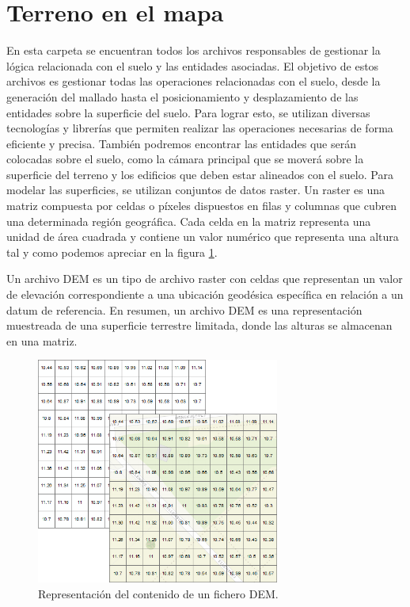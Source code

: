 \documentclass[a4paper, 11pt]{book}
\begin{document}
\section{Terreno en el mapa}
\label{sec:mapGround}
En esta carpeta se encuentran todos los archivos responsables de gestionar la lógica relacionada con el suelo y las entidades asociadas. El objetivo de estos archivos es gestionar todas las operaciones relacionadas con el suelo, desde la generación del mallado hasta el posicionamiento y desplazamiento de las entidades sobre la superficie del suelo. Para lograr esto, se utilizan diversas tecnologías y librerías que permiten realizar las operaciones necesarias de forma eficiente y precisa.
También podremos encontrar las entidades que serán colocadas sobre el suelo, como la cámara principal que se moverá sobre la superficie del terreno y los edificios que deben estar alineados con el suelo. Para modelar las superficies, se utilizan conjuntos de datos raster. Un raster es una matriz compuesta por celdas o píxeles dispuestos en filas y columnas que cubren una determinada región geográfica.
Cada celda en la matriz representa una unidad de área cuadrada y contiene un valor numérico que representa una altura tal y como podemos apreciar en la figura \ref{fig:dem}.

Un archivo DEM es un tipo de archivo raster con celdas que representan un valor de elevación correspondiente a una ubicación geodésica específica en relación a un datum de referencia. En resumen, un archivo DEM es una representación muestreada de una superficie terrestre limitada, donde las alturas se almacenan en una matriz.

\begin{figure}[h]
  \centering
  \includegraphics[width=8cm, keepaspectratio]{img/dem.png}
  \caption{Representación del contenido de un fichero DEM.}
  \label{fig:dem}
\end{figure}
\end{document}

